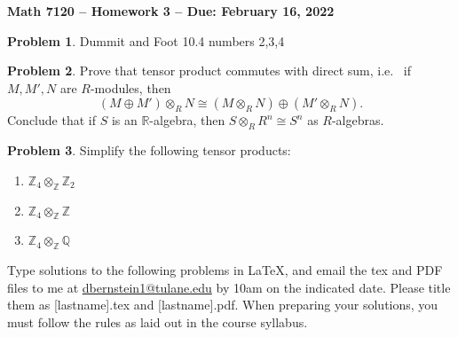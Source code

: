 \documentclass[letterpaper,11pt]{amsart}
\theoremstyle{plain}
\theoremstyle{definition}
\newtheorem{pr}{Problem}
\theoremstyle{remark}
\begin{document}
\Large

\begin{center}
{\bf Math 7120 -- Homework  3 --  Due:  February 16, 2022}
\end{center}

\normalsize

\medskip


\begin{pr}
    Dummit and Foot 10.4 numbers 2,3,4
\end{pr}

\begin{pr}
    Prove that tensor product commutes with direct sum, i.e.~ if $M,M',N$ are $R$-modules, then
    \[
        (M \oplus M')\otimes_R N \cong (M\otimes_R N) \oplus (M' \otimes_R N).
    \]
    Conclude that if $S$ is an $\mathbb{R}$-algebra, then $S\otimes_R R^n \cong S^n$ as $R$-algebras.
\end{pr}




\begin{pr}
    Simplify the following tensor products:
    \begin{enumerate}
        \item $\mathbb{Z}_4 \otimes_\mathbb{Z} \mathbb{Z}_2$
        \item $\mathbb{Z}_4 \otimes_{\mathbb{Z}} \mathbb{Z}$
        \item $\mathbb{Z}_4 \otimes_{\mathbb{Z}} \mathbb{Q}$
    \end{enumerate}
\end{pr}



\bigskip

Type solutions to the following problems in \LaTeX, and email the tex and PDF files to me at \url{dbernstein1@tulane.edu} by 10am on the indicated date.
Please title them as [lastname].tex and [lastname].pdf.
When preparing your solutions, you must follow the rules as laid out in the course syllabus.

\vspace{.5cm}

\end{document}
